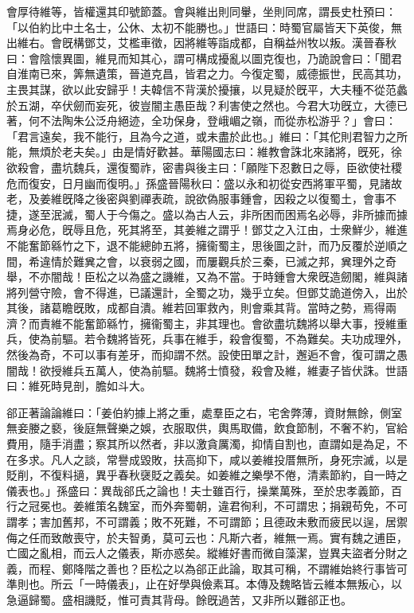 \begin{pinyinscope}
會厚待維等，皆權還其印號節蓋。會與維出則同轝，坐則同席，謂長史杜預曰：「以伯約比中土名士，公休、太初不能勝也。」世語曰：時蜀官屬皆天下英俊，無出維右。會旣構鄧艾，艾檻車徵，因將維等詣成都，自稱益州牧以叛。漢晉春秋曰：會陰懷異圖，維見而知其心，謂可構成擾亂以圖克復也，乃詭說會曰：「聞君自淮南已來，筭無遺策，晉道克昌，皆君之力。今復定蜀，威德振世，民高其功，主畏其謀，欲以此安歸乎！夫韓信不背漢於擾攘，以見疑於旣平，大夫種不從范蠡於五湖，卒伏劒而妄死，彼豈闇主愚臣哉？利害使之然也。今君大功旣立，大德已著，何不法陶朱公泛舟絕迹，全功保身，登峨嵋之嶺，而從赤松游乎？」會曰：「君言遠矣，我不能行，且為今之道，或未盡於此也。」維曰：「其佗則君智力之所能，無煩於老夫矣。」由是情好歡甚。華陽國志曰：維教會誅北來諸將，旣死，徐欲殺會，盡坑魏兵，還復蜀祚，密書與後主曰：「願陛下忍數日之辱，臣欲使社稷危而復安，日月幽而復明。」孫盛晉陽秋曰：盛以永和初從安西將軍平蜀，見諸故老，及姜維旣降之後密與劉禪表疏，說欲偽服事鍾會，因殺之以復蜀土，會事不捷，遂至泯滅，蜀人于今傷之。盛以為古人云，非所困而困焉名必辱，非所據而據焉身必危，旣辱且危，死其將至，其姜維之謂乎！鄧艾之入江由，士衆鮮少，維進不能奮節緜竹之下，退不能總帥五將，擁衞蜀主，思後圖之計，而乃反覆於逆順之間，希違情於難兾之會，以衰弱之國，而屢觀兵於三秦，已滅之邦，兾理外之奇舉，不亦闇哉！臣松之以為盛之譏維，又為不當。于時鍾會大衆旣造劒閣，維與諸將列營守險，會不得進，已議還計，全蜀之功，幾乎立矣。但鄧艾詭道傍入，出於其後，諸葛瞻旣敗，成都自潰。維若回軍救內，則會乘其背。當時之勢，焉得兩濟？而責維不能奮節緜竹，擁衞蜀主，非其理也。會欲盡坑魏將以舉大事，授維重兵，使為前驅。若令魏將皆死，兵事在維手，殺會復蜀，不為難矣。夫功成理外，然後為奇，不可以事有差牙，而抑謂不然。設使田單之計，邂逅不會，復可謂之愚闇哉！欲授維兵五萬人，使為前驅。魏將士憤發，殺會及維，維妻子皆伏誅。世語曰：維死時見剖，膽如斗大。

郤正著論論維曰：「姜伯約據上將之重，處羣臣之右，宅舍弊薄，資財無餘，側室無妾媵之褻，後庭無聲樂之娛，衣服取供，輿馬取備，飲食節制，不奢不約，官給費用，隨手消盡；察其所以然者，非以激貪厲濁，抑情自割也，直謂如是為足，不在多求。凡人之談，常譽成毀敗，扶高抑下，咸以姜維投厝無所，身死宗滅，以是貶削，不復料擿，異乎春秋襃貶之義矣。如姜維之樂學不倦，清素節約，自一時之儀表也。」孫盛曰：異哉郤氏之論也！夫士雖百行，操業萬殊，至於忠孝義節，百行之冠冕也。姜維策名魏室，而外奔蜀朝，違君徇利，不可謂忠；捐親苟免，不可謂孝；害加舊邦，不可謂義；敗不死難，不可謂節；且德政未敷而疲民以逞，居禦侮之任而致敵喪守，於夫智勇，莫可云也：凡斯六者，維無一焉。實有魏之逋臣，亡國之亂相，而云人之儀表，斯亦惑矣。縱維好書而微自藻潔，豈異夫盜者分財之義，而程、鄭降階之善也？臣松之以為郤正此論，取其可稱，不謂維始終行事皆可準則也。所云「一時儀表」，止在好學與儉素耳。本傳及魏略皆云維本無叛心，以急逼歸蜀。盛相譏貶，惟可責其背母。餘旣過苦，又非所以難郤正也。


\end{pinyinscope}
